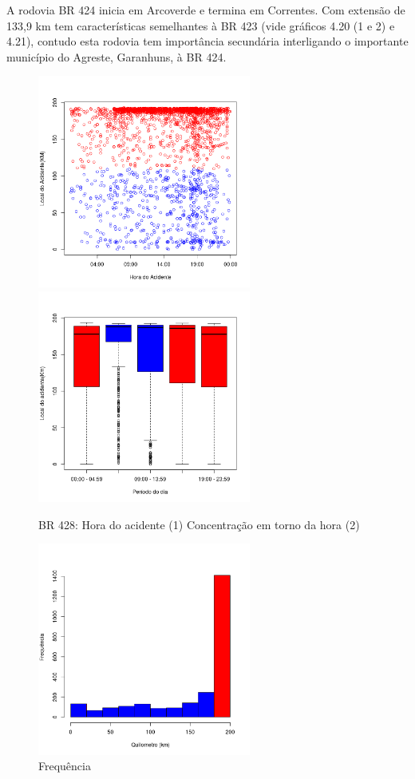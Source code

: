 A rodovia BR 424 inicia em Arcoverde e termina em Correntes. Com extensão de 133,9 km tem características semelhantes à BR 423 (vide gráficos 4.20 (1 e 2) e 4.21), contudo esta rodovia tem importância secundária interligando o importante município do Agreste, Garanhuns, à BR 424.
\pagebreak


\begin{figure}[h]
	\caption{BR 428: Hora do acidente (1) Concentração em torno da hora (2)}
	\includegraphics[width=7cm,height=7cm]{Figuras/Preprocess/br428_1.png}
	\includegraphics[width=7cm,height=7cm]{Figuras/Preprocess/br428_2.png}
	
\end{figure}

\quad \quad
\begin{figure}[h]
	\centering
	\caption{ Frequência}
	\includegraphics[width=7cm,height=7cm]{Figuras/Preprocess/br428_3.png}
\end{figure}


